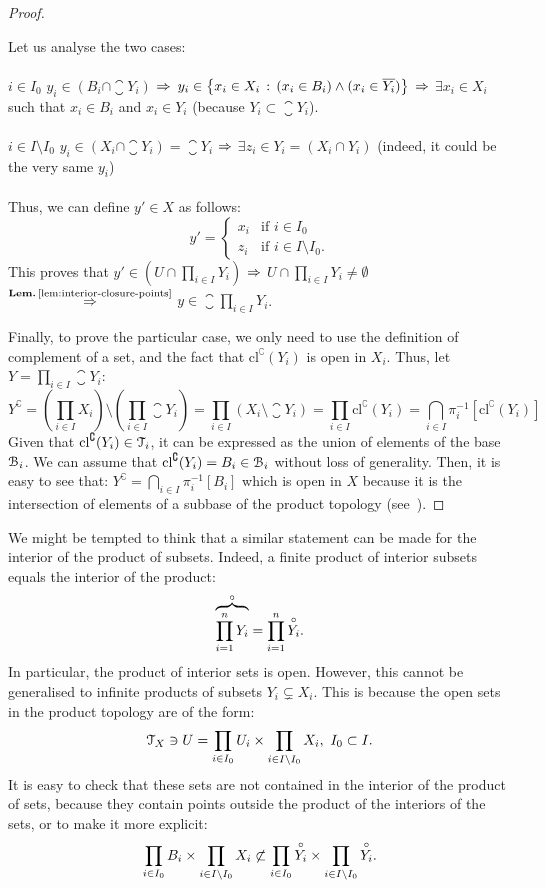 \begin{proof}
\begin{itemize}
\[\]
Let us analyse the two cases:\\
\\
\noindent{}$\boxed{i\in I_0}$ $y_i\in (B_i\cap \closure{Y_i})$ $\Rightarrow$ $y_i\in\left\{x_i\in X_i\,:\,(x_i\in B_i)\land (x_i\in \overline{Y_i})\right\}$ $\Rightarrow$ $\exists x_i\in X_i$ such that $x_i\in B_i$ and $x_i\in Y_i$ (because $Y_i\subset \closure{Y}_i$).\\
\\
\noindent{}$\boxed{i\in I\setminus I_0}$ $y_i\in (X_i\cap \closure{Y_i}) =\closure{Y_i}$ $\Rightarrow$ $\exists z_i\in Y_i=(X_i\cap Y_i)$ (indeed, it could be the very same $y_i$)\\
\\
Thus, we can define $y'\in X$ as follows:
\[
	y' = \begin{cases}
		x_i & \text{if } i\in I_0\\
		z_i & \text{if } i\in I\setminus I_0.
	\end{cases}
\]
This proves that $y'\in (U\cap\prod_{i\in I} Y_i)$ $\Rightarrow$ $U\cap \prod_{i\in I} Y_i\neq \emptyset$ $\overset{\lemref{lem:interior-closure-points}}{\Then}$ $y\in \closure{\prod_{i\in I} Y_i}$.
\end{itemize}
Finally, to prove the particular case, we only need to use the definition of complement of a set, and the fact that $\mathrm{cl}^\complement(Y_i)$ is open in $X_i$. Thus, let $Y=\prod_{i\in I}\closure{Y_i}$:
	\[
		Y^{\complement}=\left(\prod_{i\in I}X_i\right)\setminus\left(\prod_{i\in I}\closure{Y_i}\right)=\prod_{i\in I}(X_i\setminus\closure{Y_i})=\prod_{i\in I}\mathrm{cl}^\complement(Y_i)=\bigcap_{i\in I} \pi^{-1}_i[\mathrm{cl}^\complement(Y_i)]
	\]
Given that $\mathrm{cl}^\complement(Y_i) \in \EuScript{T}_{i}$, it can be expressed as the union of elements of the base $\EuScript{B}_{i}$. We can assume that $\mathrm{cl}^\complement(Y_i) = B_i\in\EuScript{B}_{i}$ without loss of generality.
Then, it is easy to see that: $Y^\complement = \bigcap_{i\in I} \pi_i^{-1}[B_i]$ which is open in $X$ because it is the intersection of elements of a subbase of the product topology (see~).
\end{proof}

\begin{remark}
	We might be tempted to think that a similar statement can be made for the interior of the product of subsets.
	Indeed, a finite product of interior subsets equals the interior of the product:
	\[
		\overbrace{\prod_{i=1}^n Y_i}^{\circ} = \prod_{i=1}^n \overset{\circ}{Y_i}.
	\]
	In particular, the product of interior sets is open.
	However, this cannot be generalised to infinite products of subsets $Y_i\subsetneq X_i$.
	This is because the open sets in the product topology are of the form:
	\[
		\EuScript{T}_X \ni U = \prod_{i\in I_0} U_i \times \prod_{i\in I\setminus I_0} X_i,\ I_0\subset I.
	\]
	It is easy to check that these sets are not contained in the interior of the product of sets, because they contain points outside the product of the interiors of the sets, or to make it more explicit:
	\[
		\prod_{i\in I_0} B_i \times \prod_{i\in I\setminus I_0} X_i \not\subset \prod_{i\in I_0} \overset{\circ}{Y_i} \times \prod_{i\in I\setminus I_0} \overset{\circ}{Y_i}.
	\]
\end{remark}

